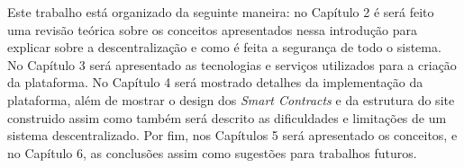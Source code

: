 Este trabalho está organizado da seguinte maneira: no Capítulo 2 é será feito uma revisão teórica sobre os conceitos apresentados nessa introdução para explicar sobre a descentralização e como é feita a segurança de todo o sistema. No Capítulo 3 será apresentado as tecnologias e serviços utilizados para a criação da plataforma. No Capítulo 4 será mostrado detalhes da implementação da plataforma, além de mostrar o design dos \textit{Smart Contracts} e da estrutura do site construido assim como também será descrito as dificuldades e limitações de um sistema descentralizado. Por fim, nos Capítulos 5 será apresentado os conceitos, e no Capítulo 6, as conclusões assim como sugestões para trabalhos futuros.\cite{curses_of_blockchain}
